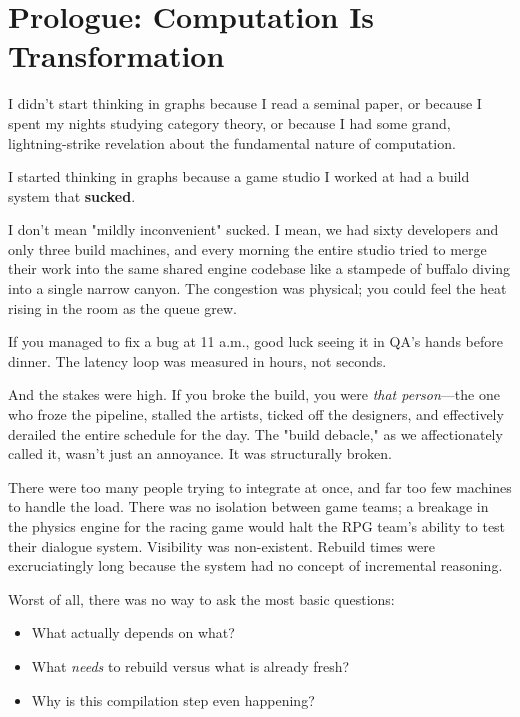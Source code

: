 \chapter*{Prologue: Computation Is Transformation}

\label{chap:computation-is-transformation}

I didn't start thinking in graphs because I read a seminal paper, or because I spent my nights studying category theory, or because I had some grand, lightning-strike revelation about the fundamental nature of computation.

I started thinking in graphs because a game studio I worked at had a build system that \textbf{sucked}.

I don't mean "mildly inconvenient" sucked. I mean, we had sixty developers and only three build machines, and every morning the entire studio tried to merge their work into the same shared engine codebase like a stampede of buffalo diving into a single narrow canyon. The congestion was physical; you could feel the heat rising in the room as the queue grew.

If you managed to fix a bug at 11 a.m., good luck seeing it in QA's hands before dinner. The latency loop was measured in hours, not seconds.

And the stakes were high. If you broke the build, you were \textit{that person}—the one who froze the pipeline, stalled the artists, ticked off the designers, and effectively derailed the entire schedule for the day. The "build debacle," as we affectionately called it, wasn't just an annoyance. It was structurally broken.

There were too many people trying to integrate at once, and far too few machines to handle the load. There was no isolation between game teams; a breakage in the physics engine for the racing game would halt the RPG team's ability to test their dialogue system. Visibility was non-existent. Rebuild times were excruciatingly long because the system had no concept of incremental reasoning.

Worst of all, there was no way to ask the most basic questions:
\begin{itemize}
    \item What actually depends on what?
    \item What \textit{needs} to rebuild versus what is already fresh?
    \item Why is this compilation step even happening?
\end{itemize}


